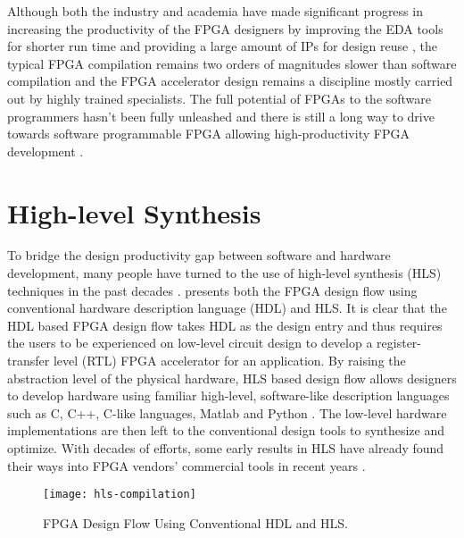 Although both the industry and academia have made significant progress in increasing the productivity of the FPGA designers by improving the EDA tools for shorter run time \cite{VivadoHLS, mulpuri2001runtime, moctar2014parallel, goeders2011deterministic} and providing a large amount of IPs for design reuse \cite{xilinx-pc, altera-pc}, the typical FPGA compilation remains two orders of magnitudes slower than software compilation and the FPGA accelerator design remains a discipline mostly carried out by highly trained specialists. The full potential of FPGAs to the software programmers hasn't been fully unleashed and there is still a long way to drive towards software programmable FPGA allowing high-productivity FPGA development \cite{fsp2014, fsp2015}.

\section{High-level Synthesis}
To bridge the design productivity gap between software and hardware development, many people have turned to the use of high-level synthesis (HLS) techniques in the past decades \cite{cong2011high}.  presents both the FPGA design flow using conventional hardware description language (HDL) and HLS. It is clear that the HDL based FPGA design flow takes HDL as the design entry and thus requires the users to be experienced on low-level circuit design to develop a register-transfer level (RTL) FPGA accelerator for an application. By raising the abstraction level of the physical hardware, HLS based design flow allows designers to develop hardware using familiar high-level, software-like description languages such as C, C++, C-like languages, Matlab and Python \cite{handel-c, ROCCC, VivadoHLS, OpenCL, matlab, myhdl}. The low-level hardware implementations are then left to the conventional design tools to synthesize and optimize. With decades of efforts, some early results in HLS have already found their ways into FPGA vendors' commercial tools in recent years \cite{OpenCL, VivadoHLS, handel-c, zhang2008autopilot, chen2005xpilot}. 

\begin{figure}
\centering
\texttt{[image: hls-compilation]}
\caption{FPGA Design Flow Using Conventional HDL and HLS.}
\label{fig:hls-compilation}
\end{figure}

